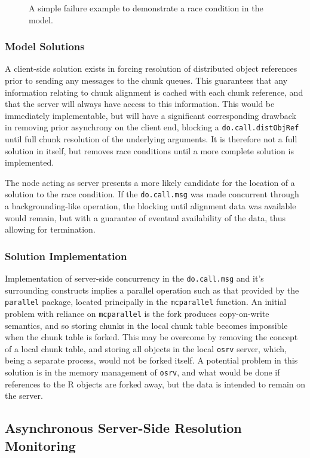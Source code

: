 \begin{figure}
	\centering
	
	\caption{\label{fig:counterex}A simple failure example to demonstrate a race condition in the model.}
\end{figure}

\subsubsection{Model Solutions}

A client-side solution exists in forcing resolution of distributed object
references prior to sending any messages to the chunk queues.
This guarantees that any information relating to chunk alignment is cached with
each chunk reference, and that the server will always have access to this
information.
This would be immediately implementable, but will have a significant
corresponding drawback in removing prior asynchrony on the client end, blocking
a \texttt{do.call.distObjRef} until full chunk resolution of the
underlying arguments.
It is therefore not a full solution in itself, but removes race conditions
until a more complete solution is implemented.

The node acting as server presents a more likely candidate for the location of
a solution to the race condition.
If the \texttt{do.call.msg} was made concurrent through a
backgrounding-like operation, the blocking until alignment data was available
would remain, but with a guarantee of eventual availability of the data, thus
allowing for termination.

\subsubsection{Solution Implementation}

Implementation of server-side concurrency in the
\texttt{do.call.msg} and it's surrounding constructs implies a
parallel operation such as that provided by the \texttt{parallel} package,
located principally in the \texttt{mcparallel} function.
An initial problem with reliance on \texttt{mcparallel} is the
fork produces copy-on-write semantics, and so storing chunks in the local chunk
table becomes impossible when the chunk table is forked.
This may be overcome by removing the concept of a local chunk table, and
storing all objects in the local \texttt{osrv} server, which, being a separate
process, would not be forked itself. 
A potential problem in this solution is in the memory management of
\texttt{osrv}, and what would be done if references to the R objects are forked
away, but the data is intended to remain on the server.

\subsection{Asynchronous Server-Side Resolution Monitoring}


